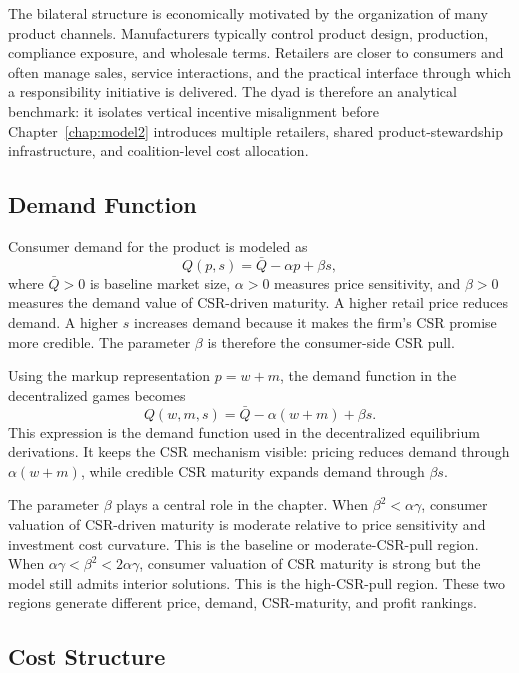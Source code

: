 The bilateral structure is economically motivated by the organization of many product channels. Manufacturers typically control product design, production, compliance exposure, and wholesale terms. Retailers are closer to consumers and often manage sales, service interactions, and the practical interface through which a responsibility initiative is delivered. The dyad is therefore an analytical benchmark: it isolates vertical incentive misalignment before Chapter~\ref{chap:model2} introduces multiple retailers, shared product-stewardship infrastructure, and coalition-level cost allocation.

\subsection{Demand Function}

Consumer demand for the product is modeled as
\begin{equation}
    Q(p,s)=\bar{Q}-\alpha p+\beta s,
    \label{eq:demand}
\end{equation}
where $\bar{Q}>0$ is baseline market size, $\alpha>0$ measures price sensitivity, and $\beta>0$ measures the demand value of CSR-driven maturity. A higher retail price reduces demand. A higher $s$ increases demand because it makes the firm's CSR promise more credible. The parameter $\beta$ is therefore the consumer-side CSR pull.

Using the markup representation $p=w+m$, the demand function in the decentralized games becomes
\begin{equation*}
    Q(w,m,s)=\bar{Q}-\alpha(w+m)+\beta s.
\end{equation*}
This expression is the demand function used in the decentralized equilibrium derivations. It keeps the CSR mechanism visible: pricing reduces demand through $\alpha(w+m)$, while credible CSR maturity expands demand through $\beta s$.

The parameter $\beta$ plays a central role in the chapter. When $\beta^2<\alpha\gamma$, consumer valuation of CSR-driven maturity is moderate relative to price sensitivity and investment cost curvature. This is the baseline or moderate-CSR-pull region. When $\alpha\gamma<\beta^2<2\alpha\gamma$, consumer valuation of CSR maturity is strong but the model still admits interior solutions. This is the high-CSR-pull region. These two regions generate different price, demand, CSR-maturity, and profit rankings.

\subsection{Cost Structure}

